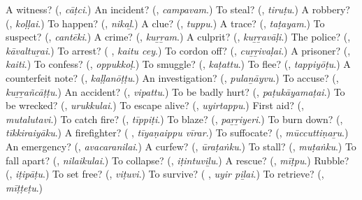 \begin{tcolorbox}[breakable,colback=teal!4,colframe=teal!35!black,title={Before you move on}]
A witness? (\textbf{}, \emph{cāṭci}.) An incident? (\textbf{}, \emph{campavam}.) To steal? (\textbf{}, \emph{tiruṭu}.) A robbery? (\textbf{}, \emph{koḷḷai}.) To happen? (\textbf{}, \emph{nikaḻ}.) A clue? (\textbf{}, \emph{tuppu}.) A trace? (\textbf{}, \emph{taṭayam}.) To suspect? (\textbf{}, \emph{cantēki}.) A crime? (\textbf{}, \emph{kuṟṟam}.) A culprit? (\textbf{}, \emph{kuṟṟavāḷi}.) The police? (\textbf{}, \emph{kāvaltuṟai}.) To arrest? (\textbf{ }, \emph{kaitu cey}.) To cordon off? (\textbf{}, \emph{cuṟṟivaḷai}.) A prisoner? (\textbf{}, \emph{kaiti}.) To confess? (\textbf{}, \emph{oppukkoḷ}.) To smuggle? (\textbf{}, \emph{kaṭattu}.) To flee? (\textbf{}, \emph{tappiyōṭu}.) A counterfeit note? (\textbf{}, \emph{kaḷḷanōṭṭu}.) An investigation? (\textbf{}, \emph{pulaṉāyvu}.) To accuse? (\textbf{}, \emph{kuṟṟañcāṭṭu}.) An accident? (\textbf{}, \emph{vipattu}.) To be badly hurt? (\textbf{}, \emph{paṭukāyamaṭai}.) To be wrecked? (\textbf{}, \emph{urukkulai}.) To escape alive? (\textbf{}, \emph{uyirtappu}.) First aid? (\textbf{}, \emph{mutalutavi}.) To catch fire? (\textbf{}, \emph{tīppiṭi}.) To blaze? (\textbf{}, \emph{paṟṟiyeri}.) To burn down? (\textbf{}, \emph{tīkkiraiyāku}.) A firefighter? (\textbf{ }, \emph{tīyaṇaippu vīrar}.) To suffocate? (\textbf{}, \emph{mūccuttiṇaṟu}.) An emergency? (\textbf{}, \emph{avacaranilai}.) A curfew? (\textbf{}, \emph{ūraṭaṅku}.) To stall? (\textbf{}, \emph{muṭaṅku}.) To fall apart? (\textbf{}, \emph{nilaikulai}.) To collapse? (\textbf{}, \emph{iṭintuviḻu}.) A rescue? (\textbf{}, \emph{mīṭpu}.) Rubble? (\textbf{}, \emph{iṭipāṭu}.) To set free? (\textbf{}, \emph{viṭuvi}.) To survive? (\textbf{ }, \emph{uyir piḻai}.) To retrieve? (\textbf{}, \emph{mīṭṭeṭu}.)
\end{tcolorbox}
